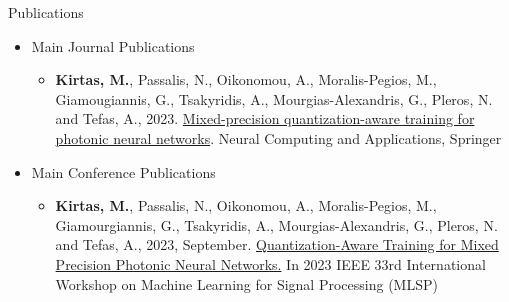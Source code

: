 \begin{frame}{Publications}
\begin{itemize}
    \item Main Journal Publications
    \begin{itemize}
        \item {\scriptsize\textbf{Kirtas, M.}, Passalis, N., Oikonomou, A., Moralis-Pegios, M.,
      Giamougiannis, G., Tsakyridis, A., Mourgias-Alexandris, G., Pleros, N. and Tefas, A., 2023. \href{https://link.springer.com/article/10.1007/s00521-023-08848-8}{Mixed-precision quantization-aware training for photonic neural networks}. Neural Computing and Applications, Springer}
    \end{itemize}
    \item Main Conference Publications 
        \begin{itemize}
        \item {\scriptsize \textbf{Kirtas, M.}, Passalis, N., Oikonomou, A., Moralis-Pegios, M.,
      Giamourgiannis, G., Tsakyridis, A., Mourgias-Alexandris, G., Pleros, N. and Tefas, A., 2023, September.
      \href{https://ieeexplore.ieee.org/document/10285966}{Quantization-Aware Training for Mixed Precision Photonic Neural Networks.} In 2023 IEEE 33rd International Workshop on Machine Learning for Signal Processing (MLSP)} 
    \end{itemize}
\end{itemize}
\end{frame}
